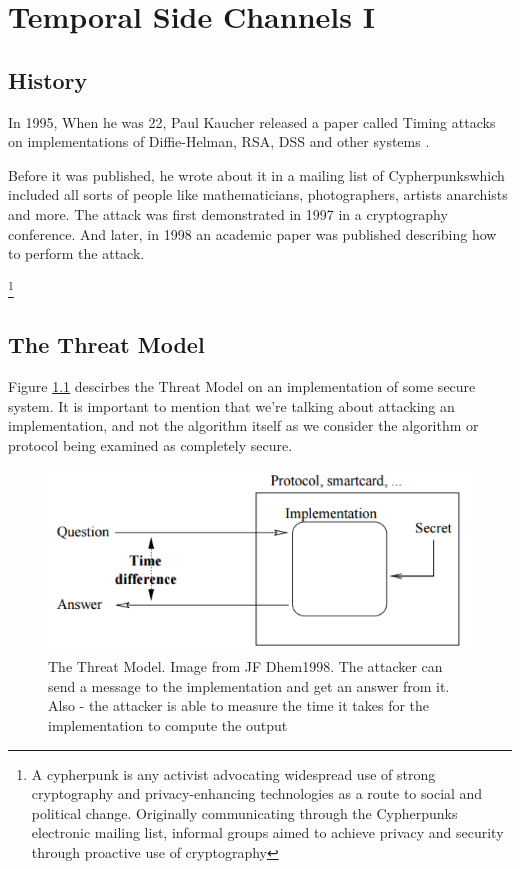 \chapter{Temporal Side Channels I} 

\section{History}
In 1995, When he was 22, Paul Kaucher released a paper called Timing attacks on implementations of Diffie-Helman, RSA, DSS and other systems \cite{kocher1996timing}.

Before it was published, he wrote about it in a mailing list of Cypherpunks\footnotemark[1] 
which included all sorts of people like mathematicians, photographers, artists anarchists and more.
The attack was first demonstrated in 1997 in a cryptography conference.
And later, in 1998 an academic paper was published describing how to perform the attack.

\footnote[1]{A cypherpunk is any activist advocating widespread use of strong cryptography and privacy-enhancing technologies as a route to social and political change. Originally communicating through the Cypherpunks electronic mailing list, informal groups aimed to achieve privacy and security through proactive use of cryptography}

\section{The Threat Model}
Figure \ref{c1_fig_threat_model} descirbes the Threat Model on an implementation of some secure system.
It is important to mention that we're talking about attacking an implementation, and not the algorithm itself as we consider the algorithm or protocol being examined as completely secure.


\begin{figure}[H]
    \centering
    \includegraphics{images/chapter_1/threat_model.png}
    \caption{The Threat Model. Image from JF Dhem1998.
     The attacker can send a message to the implementation and get an answer from it. Also - the attacker is able to measure the time it takes for the implementation to compute the output}
    \label{c1_fig_threat_model}
\end{figure}

